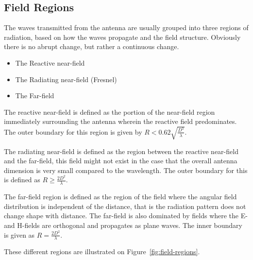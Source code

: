 \subsection{Field Regions}
The waves transmitted from the antenna are usually grouped into three regions of radiation, based on how the waves propagate and the field structure\cite{balanis2012antenna}. Obviously there is no abrupt change, but rather a continuous change.

\begin{itemize}
\item The Reactive near-field 
\item The Radiating near-field (Fresnel)
\item The Far-field
\end{itemize}

The reactive near-field is defined as the portion of the near-field region immediately surrounding the antenna wherein the reactive field predominates\cite{balanis2012antenna}. The outer boundary for this region is given by $R < 0.62 \sqrt{\frac{D^3}{\lambda}}$\cite{balanis2012antenna}.

The radiating near-field is defined as the region between the reactive near-field and the far-field, this field might not exist in the case that the overall antenna dimension is very small compared to the wavelength. The outer boundary for this is defined as $R \geq \frac{2D^2}{\lambda}$\cite{balanis2012antenna}.

The far-field region is defined as the region of the field where the angular field distribution is independent of the distance, that is the radiation pattern does not change shape with distance. The far-field is also dominated by fields where the E- and H-fields are orthogonal and propagates as plane waves. The inner boundary is given as $R = \frac{2D^2}{\lambda}$\cite{balanis2012antenna}.

These different regions are illustrated on Figure~\ref{fig:field-regions}. 

